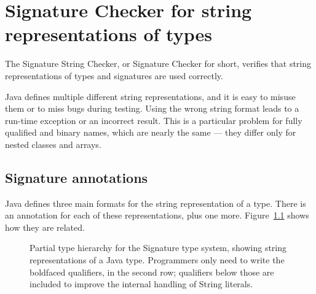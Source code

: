 \htmlhr
\chapter{Signature Checker for string representations of types\label{signature-checker}}

The Signature String Checker, or Signature Checker for short, verifies that
string representations of types and signatures are used correctly.

Java defines multiple different string representations, and it is easy to
misuse them or to miss bugs during testing.  Using the wrong string format
leads to a run-time exception or an incorrect result.  This is a particular
problem for fully qualified and binary names, which are nearly the same ---
they differ only for nested classes and arrays.


\section{Signature annotations\label{signature-annotations}}

Java defines three main formats for the string representation of a type.
There is an annotation for each of these representations, plus one more.
Figure~\ref{fig-signature-hierarchy} shows how they are related.

\begin{figure}
\caption{Partial type hierarchy for the Signature type system, showing
  string representations of a Java type.  Programmers only need to write
  the boldfaced qualifiers, in the second row; qualifiers below those are
  included to improve the internal handling of String literals.}
\label{fig-signature-hierarchy}
\end{figure}


